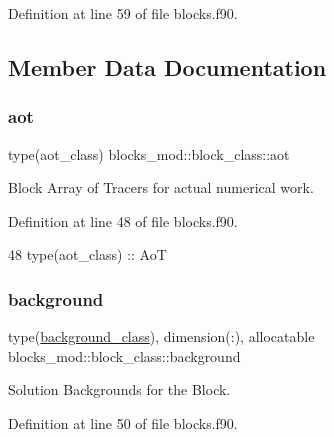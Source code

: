 Definition at line 59 of file blocks.\+f90.



\subsection{Member Data Documentation}
\mbox{\label{structblocks__mod_1_1block__class_a53f912fe57eb5e386ca62b1dbd087417}} 
\subsubsection{\texorpdfstring{aot}{aot}}
{\footnotesize\ttfamily type(aot\+\_\+class) blocks\+\_\+mod\+::block\+\_\+class\+::aot\hspace{0.3cm}{\ttfamily [private]}}



Block Array of Tracers for actual numerical work. 



Definition at line 48 of file blocks.\+f90.


\begin{DoxyCode}
48         \textcolor{keywordtype}{type}(aot\_class)        :: AoT
\end{DoxyCode}
\mbox{\label{structblocks__mod_1_1block__class_a774c07bf82d1392236abc81c285ea943}} 
\subsubsection{\texorpdfstring{background}{background}}
{\footnotesize\ttfamily type(\mbox{\hyperlink{structbackground__mod_1_1background__class}{background\+\_\+class}}), dimension(\+:), allocatable blocks\+\_\+mod\+::block\+\_\+class\+::background\hspace{0.3cm}{\ttfamily [private]}}



Solution Backgrounds for the Block. 



Definition at line 50 of file blocks.\+f90.


